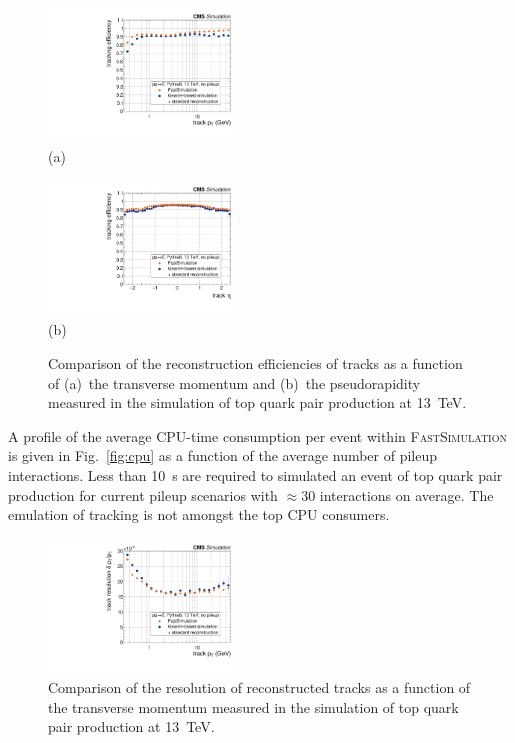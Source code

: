 \documentclass[a4paper]{jpconf}
\begin{document}
\begin{figure}[!htbp]
\begin{center}
\parbox{0.46\textwidth}{\centering\includegraphics[width=0.45\textwidth]{figures/eff_pt.pdf}\\(a)}
\hspace{0.05\textwidth}
\parbox{0.46\textwidth}{\centering\includegraphics[width=0.45\textwidth]{figures/eff_eta.pdf}\\(b)}
\caption{\label{fig:eff-tracks}Comparison of the reconstruction efficiencies of tracks as a function of (a)~the transverse momentum and (b)~the pseudorapidity measured in the simulation of top quark pair production at 13~TeV.}
\end{center}
\end{figure}



A profile of the average CPU-time consumption per event within \textsc{FastSimulation} is given in Fig.~\ref{fig:cpu} as a function of the average number of pileup interactions. Less than 10~s are required to simulated an event of top quark pair production for current pileup scenarios with $\approx30$ interactions on average. The emulation of tracking is not amongst the top CPU consumers.


\begin{figure}[!htbp]
\begin{center}
\includegraphics[width=0.45\textwidth]{figures/res_pt.pdf}
\caption{\label{fig:res-track}Comparison of the resolution of reconstructed tracks as a function of the transverse momentum measured in the simulation of top quark pair production at 13~TeV.}
\end{center}
\end{figure}
\end{document}
